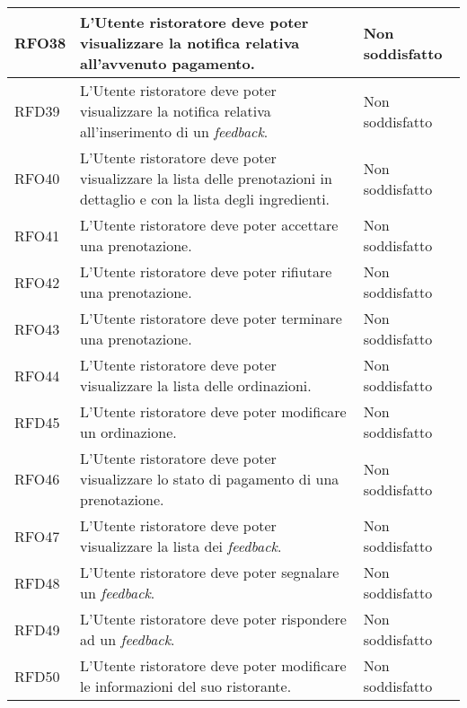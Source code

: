 \begin{longtable}{|l|p{}|p{3cm}|}
	\hline
	RFO38       & L'Utente ristoratore deve poter visualizzare la notifica relativa all'avvenuto pagamento.                               & Non soddisfatto \\
	\hline
	RFD39       & L'Utente ristoratore deve poter visualizzare la notifica relativa all'inserimento di un \textit{feedback}.              & Non soddisfatto \\
	\hline
	RFO40       & L'Utente ristoratore deve poter visualizzare la lista delle prenotazioni in dettaglio e con la lista degli ingredienti. & Non soddisfatto \\
	\hline
	RFO41       & L'Utente ristoratore deve poter accettare una prenotazione.                                                             & Non soddisfatto \\
	\hline
	RFO42       & L'Utente ristoratore deve poter rifiutare una prenotazione.                                                             & Non soddisfatto \\
	\hline
	RFO43       & L'Utente ristoratore deve poter terminare una prenotazione.                                                             & Non soddisfatto \\
	\hline
	RFO44       & L'Utente ristoratore deve poter visualizzare la lista delle ordinazioni.                                                & Non soddisfatto \\
	\hline
	RFD45       & L'Utente ristoratore deve poter modificare un ordinazione.                                                              & Non soddisfatto \\
	\hline
	RFO46       & L'Utente ristoratore deve poter visualizzare lo stato di pagamento di una prenotazione.                                 & Non soddisfatto \\
	\hline
	RFO47       & L'Utente ristoratore deve poter visualizzare la lista dei \textit{feedback}.                                            & Non soddisfatto \\
	\hline
	RFD48       & L'Utente ristoratore deve poter segnalare un \textit{feedback}.                                                         & Non soddisfatto \\
	\hline
	RFD49       & L'Utente ristoratore deve poter rispondere ad un \textit{feedback}.                                                     & Non soddisfatto \\
	\hline
	RFD50       & L'Utente ristoratore deve poter modificare le informazioni del suo ristorante.                                          & Non soddisfatto \\

\end{longtable}

